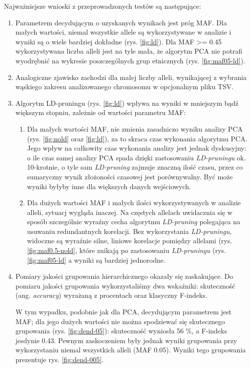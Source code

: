 \documentclass[a4paper]{article}
\begin{document}
Najważniejsze wnioski z przeprowadzonych testów są następujące:
\begin{enumerate}
\item Parametrem decydującym o uzyskanych wynikach jest próg MAF. Dla małych wartości, niemal wszystkie allele są wykorzystywane w analizie i wyniki są o wiele bardziej dokładne (rys. \ref{fig:ld}). Dla MAF >= 0.45 wykorzystywana liczba alleli jest na tyle mała, że algorytm PCA nie potrafi wyodrębnić na wykresie poszczególnych grup etnicznych (rys. \ref{fig:maf05-ld}). 
\item Analogiczne zjawisko zachodzi dla małej liczby alleli, wynikającej z wybrania wąskiego zakresu analizowanego chromosomu w opcjonalnym pliku TSV. 
\item Algorytm LD-pruningu (rys. \ref{fig:ld}) wpływa na wyniki w mniejszym bądź większym stopniu, zależnie od wartości parametru MAF:
\begin{enumerate}
\item Dla małych wartości MAF, nie zmienia zasadniczo wyniku analizy PCA (rys. \ref{fig:nold} oraz \ref{fig:ld}), za to skraca czas wykonania algorytmu PCA. Jego wpływ na całkowity czas wykonania analizy jest jednak dyskusyjny: o ile czas samej analizy PCA spada dzięki zastosowaniu \emph{LD-pruningu} ok. 10-krotnie, o tyle sam \emph{LD-pruning} zajmuje znaczną ilość czasu, przez co sumaryczny wynik złożoności czasowej jest porównywalny. Być może wyniki byłyby inne dla większych danych wejściowych. 
\item Dla dużych wartości MAF i małych ilości wykorzystywanych w analizie alleli, sytuacj wygląda inaczej. Na częstych allelach uwidacznia się w sposób szczególnie wyraźny cecha algorytmu \emph{LD-pruning} polegająca na usuwaniu redundantnych korelacji. Bez wykorzystania \emph{LD-pruningu}, widoczne są wyraźnie silne, liniowe korelacje pomiędzy allelami (rys. \ref{fig:maf0.5-nold}, które znikają po zastosowaniu \emph{LD-pruningu} (rys. \ref{fig:maf05-ld} a wyniki są bardziej jednorodne. 
\end{enumerate}
\item Pomiary jakości grupowania hierarchicznego okazały się zaskakujące. Do pomiaru jakości grupowania wykorzystaliśmy dwa wskaźniki: skuteczność (ang. \emph{accuracy}) wyrażaną z procentach oraz klasyczny F-indeks. 

W tym wypadku, podobnie jak dla PCA, decydującym parametrem jest MAF; dla jego dużych wartości nie można spodziewać się skutecznego grupowania (rys. \ref{fig:dend-05}): skuteczność wyniosła 56 \%, a F-indeks jesdynie 0.43. Pewnym zaskoczeniem były jednak wyniki grupowania przy wykorzystaniu niemal wszystkich alleli (MAF 0.05). Wyniki tego grupowania prezentuje rys. \ref{fig:dend-005}. 


\end{enumerate}
\end{document}
